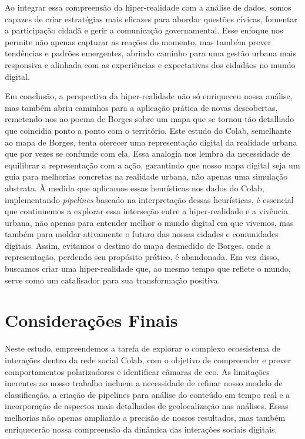 Ao integrar essa compreensão da hiper-realidade com a análise de dados, somos capazes de criar estratégias mais eficazes para abordar questões cívicas, fomentar a participação cidadã e gerir a comunicação governamental. Esse enfoque nos permite não apenas capturar as reações do momento, mas também prever tendências e padrões emergentes, abrindo caminho para uma gestão urbana mais responsiva e alinhada com as experiências e expectativas dos cidadãos no mundo digital.

Em conclusão, a perspectiva da hiper-realidade não só enriqueceu nossa análise, mas também abriu caminhos para a aplicação prática de novas descobertas, remetendo-nos ao poema de Borges sobre um mapa que se tornou tão detalhado que coincidia ponto a ponto com o território. Este estudo do Colab, semelhante ao mapa de Borges, tenta oferecer uma representação digital da realidade urbana que por vezes se confunde com ela. Essa analogia nos lembra da necessidade de equilibrar a representação com a ação, garantindo que nosso mapa digital seja um guia para melhorias concretas na realidade urbana, não apenas uma simulação abstrata. À medida que aplicamos essas heurísticas nos dados do Colab, implementando \textit{pipelines} baseado na interpretação dessas heurísticas, é essencial que continuemos a explorar essa interseção entre a hiper-realidade e a vivência urbana, não apenas para entender melhor o mundo digital em que vivemos, mas também para moldar ativamente o futuro das nossas cidades e comunidades digitais. Assim, evitamos o destino do mapa desmedido de Borges, onde a representação, perdendo seu propósito prático, é abandonada. Em vez disso, buscamos criar uma hiper-realidade que, ao mesmo tempo que reflete o mundo, serve como um catalisador para sua transformação positiva.

\section{Considerações Finais}

Neste estudo, empreendemos a tarefa de explorar o complexo ecossistema de interações dentro da rede social Colab, com o objetivo de compreender e prever comportamentos polarizadores e identificar câmaras de eco. As limitações inerentes ao nosso trabalho incluem a necessidade de refinar nosso modelo de classificação, a criação de pipelines para análise do conteúdo em tempo real e a incorporação de aspectos mais detalhados de geolocalização nas análises. Essas melhorias não apenas ampliarão a precisão de nossos resultados, mas também enriquecerão nossa compreensão da dinâmica das interações sociais digitais.


